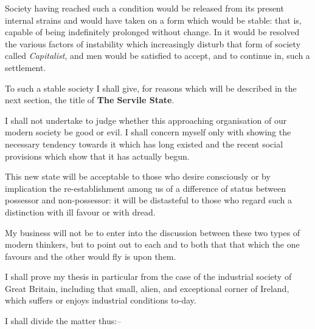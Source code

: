 \documentclass{book}
\begin{document}
Society having reached such a condition would be released from its present internal strains and would have taken on a form which would be stable: that is, capable of being indefinitely prolonged without change. In it would be resolved the various factors of instability which increasingly disturb that form of society called \emph{Capitalist}, and men would be satisfied to accept, and to continue in, such a settlement.

To such a stable society I shall give, for reasons which will be described in the next section, the title of \textbf{The Servile State}.

I shall not undertake to judge whether this approaching organisation of our modern society be good or evil. I shall concern myself only with showing the necessary tendency towards it which has long existed and the recent social provisions which show that it has actually begun.

This new state will be acceptable to those who desire consciously or by implication the re-establishment among us of a difference of status between possessor and non-possessor: it will be distasteful to those who regard such a distinction with ill favour or with dread.

My business will not be to enter into the discussion between these two types of modern thinkers, but to point out to each and to both that that which the one favours and the other would fly is upon them.

I shall prove my thesis in particular from the case of the industrial society of Great Britain, including that small, alien, and exceptional corner of Ireland, which suffers or enjoys industrial conditions to-day.

I shall divide the matter thus:–
\end{document}
